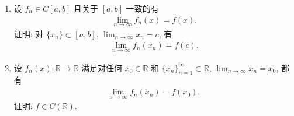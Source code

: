 \documentclass[../../main.tex]{subfiles}
\begin{document}
\begin{proposition}
\begin{enumerate}
\item 设 \(f_n\in C[a,b]\) 且关于 \([a,b]\) 一致的有
\begin{align*}
\lim_{n \to \infty}f_n(x)=f(x).
\end{align*}
证明: 对 \(\{x_n\}\subset [a,b]\), \(\lim_{n \to \infty}x_n = c\), 有
\begin{align*}
\lim_{n \to \infty}f_n(x_n)=f(c).
\end{align*}

\item 设 \(f_n(x):\mathbb{R}\to\mathbb{R}\) 满足对任何 \(x_0\in\mathbb{R}\) 和 \(\{x_n\}_{n = 1}^{\infty}\subset\mathbb{R}\), \(\lim_{n \to \infty}x_n = x_0\), 都有
\begin{align*}
\lim_{n \to \infty}f_n(x_n)=f(x_0),
\end{align*}
证明: \(f\in C(\mathbb{R})\). 
\end{enumerate}
\end{proposition}
\end{document}
